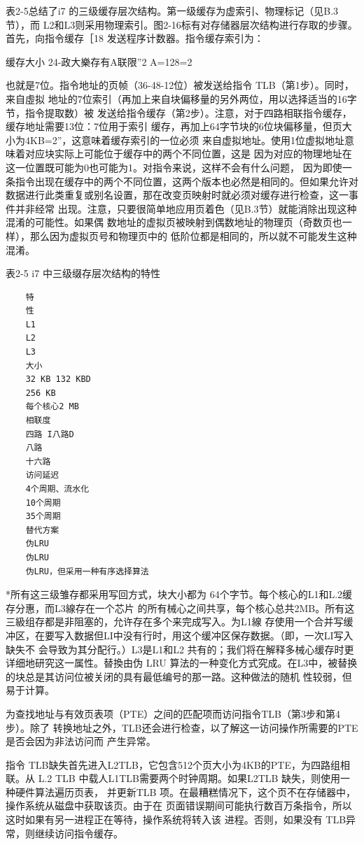 表2-5总结了i7 的三级缓存层次结构。第一级缓存为虚索引、物理标记（见B.3节），而
L2和L3则采用物理索引。图2-16标有对存储器层次结构进行存取的步骤。首先，向指令缓存［18
发送程序计数器。指令缓存索引为：

缓存大小
24-政大樂存有A联限”2
A=128=2

也就是7位。指令地址的页帧（36-48-12位）被发送给指令 TLB（第1步）。同时，来自虛拟
地址的7位索引（再加上来自块偏移量的另外两位，用以选择适当的16字节，指令提取数）被
发送给指令缓存（第2步）。注意，对于四路相联指令缓存，缓存地址需要13位：7位用于索引
缓存，再加上64字节块的6位块偏移量，但页大小为4KB=2”，这意味着缓存索引的一位必须
来自虚拟地址。使用1位虚拟地址意味着对应块实际上可能位于缓存中的两个不同位置，这是
因为对应的物理地址在这一位置既可能为0也可能为1。对指令来说，这样不会有什么问题，
因为即使一条指令出现在缓存中的两个不同位置，这两个版本也必然是相同的。但如果允许对
数据进行此类重复或别名设置，那在改变页映射时就必须对缓存进行检查，这一事件并非经常
出现。注意，只要很简单地应用页着色（见B.3节）就能消除出现这种混淆的可能性。如果偶
数地址的虚拟页被映射到偶数地址的物理页（奇数页也一样），那么因为虚拟页号和物理页中的
低阶位都是相同的，所以就不可能发生这种混淆。

表2-5 i7 中三级缀存层次结构的特性
\begin{verbatim}
    特
    性
    L1
    L2
    L3
    大小
    32 KB 132 KBD
    256 KB
    每个核心2 MB
    相联度
    四路 I八路D
    八路
    十六路
    访问延迟
    4个周期、流水化
    10个周期
    35个周期
    替代方案
    伪LRU
    伪LRU
    伪LRU，但采用一种有序选择算法
\end{verbatim}
*所有这三级雏存都采用写回方式，块大小都为 64个字节。每个核心的L1和L.2缓存分惠，而L3線存在一个芯片
的所有械心之间共享，每个核心总共2MB。所有这三級组存都是非阻塞的，允许存在多个来完成写入。为L1線
存使用一个合并写缓冲区，在要写入数据但LI中没有行时，用这个缓冲区保存数据。（即，一次LI写入缺失不
会导致为其分配行。）L3是L1和L2 共有的；我们将在解释多械心缓存时更详细地研究这一属性。替換由伪 LRU
算法的一种变化方式究成。在L3中，被替换的块总是其访问位被关闭的具有最低编号的那一路。这种做法的随机
性较弱，但易于计算。

为查找地址与有效页表项（PTE）之间的匹配项而访问指令TLB（第3步和第4步）。除了
转换地址之外，TLB还会进行检查，以了解这一访问操作所需要的PTE是否会因为非法访问而
产生异常。

指令 TLB缺失首先进入L2TLB，它包含512个页大小为4KB的PTE，为四路组相联。从
L.2 TLB 中载人L1TLB需要两个时钟周期。如果L2TLB 缺失，则使用一种硬件算法遍历页表，
并更新TLB 项。在最糟糕情况下，这个页不在存储器中，操作系统从磁盘中获取该页。由于在
页面错误期间可能执行数百万条指令，所以这时如果有另一进程正在等待，操作系统将转入该
进程。否则，如果没有 TLB异常，则继续访问指令缓存。

